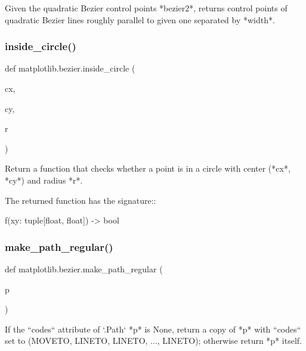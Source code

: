 \begin{DoxyVerb}Given the quadratic Bezier control points *bezier2*, returns
control points of quadratic Bezier lines roughly parallel to given
one separated by *width*.
\end{DoxyVerb}
 \mbox{\label{namespacematplotlib_1_1bezier_a821fdbdadfd91bc2c65943bd0e825a93}} 
\subsubsection{\texorpdfstring{inside\+\_\+circle()}{inside\_circle()}}
{\footnotesize\ttfamily def matplotlib.\+bezier.\+inside\+\_\+circle (\begin{DoxyParamCaption}\item[{}]{cx,  }\item[{}]{cy,  }\item[{}]{r }\end{DoxyParamCaption})}

\begin{DoxyVerb}Return a function that checks whether a point is in a circle with center
(*cx*, *cy*) and radius *r*.

The returned function has the signature::

    f(xy: tuple[float, float]) -> bool
\end{DoxyVerb}
 \mbox{\label{namespacematplotlib_1_1bezier_a0c03d7bf08d07e6d6f17e5c2d67a5875}} 
\subsubsection{\texorpdfstring{make\+\_\+path\+\_\+regular()}{make\_path\_regular()}}
{\footnotesize\ttfamily def matplotlib.\+bezier.\+make\+\_\+path\+\_\+regular (\begin{DoxyParamCaption}\item[{}]{p }\end{DoxyParamCaption})}

\begin{DoxyVerb}If the ``codes`` attribute of `.Path` *p* is None, return a copy of *p*
with ``codes`` set to (MOVETO, LINETO, LINETO, ..., LINETO); otherwise
return *p* itself.
\end{DoxyVerb}
 \mbox{\label{namespacematplotlib_1_1bezier_a8a1dac2d69f980a2facceedfa1a32cee}} 

